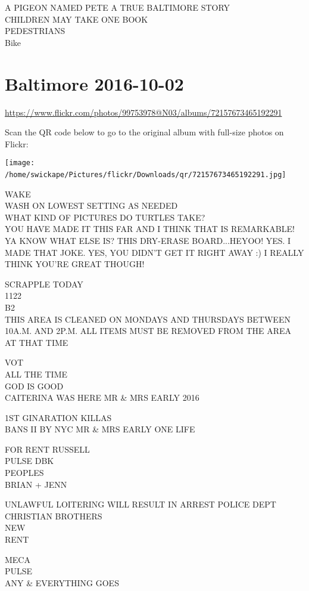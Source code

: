 \documentclass[10pt,letterpaper]{article}
\begin{document}
A PIGEON NAMED PETE A TRUE BALTIMORE STORY\\
CHILDREN MAY TAKE ONE BOOK\\
PEDESTRIANS\\
Bike
\

\section*{Baltimore 2016-10-02}

\url{https://www.flickr.com/photos/99753978@N03/albums/72157673465192291}

Scan the QR code below to go to the original album with full-size photos on Flickr:

\texttt{[image: /home/swickape/Pictures/flickr/Downloads/qr/72157673465192291.jpg]}
\

WAKE\\
WASH ON LOWEST SETTING AS NEEDED\\
WHAT KIND OF PICTURES DO TURTLES TAKE?\\
YOU HAVE MADE IT THIS FAR AND I THINK THAT IS REMARKABLE!  YA KNOW WHAT ELSE IS?  THIS DRY{-}ERASE BOARD...HEYOO! YES.  I MADE THAT JOKE.  YES, YOU DIDN'T GET IT RIGHT AWAY :) I REALLY THINK YOU'RE GREAT THOUGH!

SCRAPPLE TODAY\\
1122\\
B2\\
THIS AREA IS CLEANED ON MONDAYS AND THURSDAYS BETWEEN 10A.M. AND 2P.M. ALL ITEMS MUST BE REMOVED FROM THE AREA AT THAT TIME

VOT\\
ALL THE TIME\\
GOD IS GOOD\\
CAITERINA WAS HERE MR \& MRS EARLY 2016

1ST GINARATION KILLAS\\
BANS II BY NYC MR \& MRS EARLY ONE LIFE

FOR RENT RUSSELL\\
PULSE DBK\\
PEOPLES\\
BRIAN + JENN

UNLAWFUL LOITERING WILL RESULT IN ARREST POLICE DEPT\\
CHRISTIAN BROTHERS\\
NEW\\
RENT

MECA\\
PULSE\\
ANY \& EVERYTHING GOES
\end{document}
